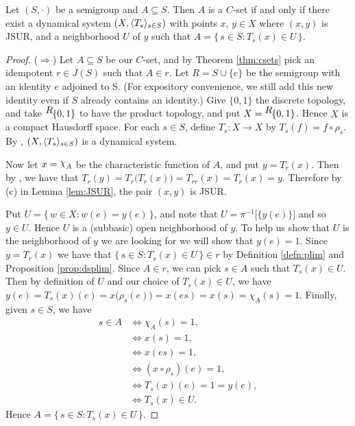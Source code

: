   \begin{thm}
    \label{thm:dyncsets}
    Let $(S,\cdot)$ be a semigroup and $A \subseteq S$. 
    Then $A$ is a $C$-set if and only if there exist a dynamical
    system $(X, \langle T_s \rangle_{s \in S})$ with points $x$, $y \in X$ where $(x,y)$ is JSUR, and
    a neighborhood $U$ of $y$ such that $A = \{\, s \in S : T_s(x) \in
    U \,\}$.
  \end{thm}
  \begin{proof}
    ($\Rightarrow$) Let $A \subseteq S$ be our $C$-set, and by
    Theorem \ref{thm:csets} pick an idempotent $r \in J(S)$ such that
    $A \in r$. 
    Let $R = S \cup \{e\}$ be the semigroup with an identity $e$
    adjoined to S. 
    (For expository convenience, we still add this new identity even
    if $S$ already contains an identity.)
    Give $\{0,1\}$ the discrete topology, and take
    $\hbox{${}^{\hbox{$R$}}\hskip -1 pt \{0,1\}$}$ to have
    the product topology, and put $X = \hbox{${}^{\hbox{$R$}}\hskip -1 pt \{0,1\}$}$.
    Hence $X$ is a compact Hausdorff space.
    For each $s \in S$, define $T_s : X \to X$ by $T_s(f) = f \circ
    \rho_s$. 
    By \cite[Theorem 19.14]{Hindman:1998fk}, $(X, \langle T_s \rangle_{s \in S})$ is a dynamical
    system. 
    
    Now let $x = \cchi_A$ be the characteristic function of $A$, and
    put $y = T_r(x)$.
    Then by \cite[Remark 19.13]{Hindman:1998fk}, we have that $T_r(y)
    = T_r\bigl(T_r(x)\bigr) = T_{rr}(x) = T_r(x) = y$.
    Therefore by (c) in Lemma \ref{lem:JSUR}, the pair $(x, y)$ is JSUR.

    Put $U = \{\, w \in X : w(e) = y(e) \,\}$, and note that $U =
    \pi^{-1}\bigl[\{y(e)\}\bigr]$ and so $y \in U$. 
    Hence $U$ is a (subbasic) open neighborhood of $y$.
    To help us show that $U$ is the neighborhood of $y$ we are looking
    for we will show that $y(e) = 1$.
    Since $y = T_r(x)$ we have that $\{\, s \in S : T_s(x) \in U \,\}
    \in r$ by Definition \ref{defn:plim} and Proposition \ref{prop:dsplim}.
    Since $A \in r$, we can pick $s \in A$ such that $T_s(x) \in U$. 
    Then by definition of $U$ and our choice of $T_s(x) \in U$, we
    have $y(e) = T_s(x)(e) = x\bigl(\rho_s(e)\bigr) = x(es) = x(s) =
    \chi_{A}(s) = 1$. 
    Finally, given $s \in S$, we have
      \begin{align*}
        s \in A &\iff \chi_{A}(s) = 1, \\
                &\iff x(s) = 1, \\
                &\iff x(es) = 1, \\
                &\iff (x \circ \rho_s)(e) = 1, \\
                &\iff T_s(x)(e) = 1 = y(e), \\
                &\iff T_s(x) \in U.
      \end{align*}
   Hence $A = \{\, s \in S : T_s(x) \in U \,\}$. 
   

\end{proof}
